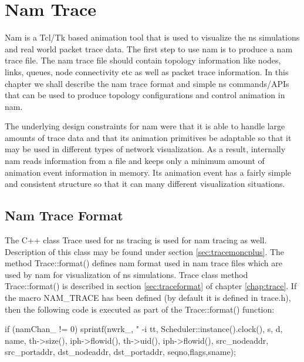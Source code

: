 \chapter{Nam Trace}
\label{chap:namtrace}

Nam is a Tcl/Tk based animation tool that is used to visualize the ns
simulations and real world packet trace data. The first step to use nam is
to produce a nam trace file. The nam trace file should contain topology
information like nodes, links, queues, node connectivity etc as well as
packet trace information. In this chapter we shall describe the nam trace
format and simple ns commands/APIs that can be used to produce topology 
configurations and control animation in nam.

The underlying design constraints for nam were that it is able to handle large amounts of trace data and that its animation primitives be adaptable so that it may be used in different types of network visualization. As a result, internally nam reads information from a file and keeps only a minimum amount of animation event information in memory.  Its animation event has a fairly simple and consistent structure so that it can many different visualization situations. 

\section{Nam Trace Format}
\label{sec:namtraceformat}
The C++ class Trace used for ns tracing is used for nam tracing as
well. Description of this class may be found under section
\ref{sec:tracemoncplus}. The method Trace::format() defines nam 
format used in nam trace files which are used by nam for
visualization of ns simulations. Trace class method Trace::format() is
described in section \ref{sec:traceformat} of chapter \ref{chap:trace}. If
the macro NAM\_TRACE has been defined (by default it is defined in
trace.h), then the following code is executed as part of the
Trace::format() function:

\begin{program}
        if (namChan_ != 0)
                sprintf(nwrk_,
                        "%
-i %
                        tt,
                        Scheduler::instance().clock(),
                        s,
                        d,
                        name,
                        th->size(),
                        iph->flowid(),
                        th->uid(),
                        iph->flowid(),
                        src\_nodeaddr,
                        src\_portaddr,
                        dst\_nodeaddr,
                        dst\_portaddr,
                        seqno,flags,sname);
\end{program}

